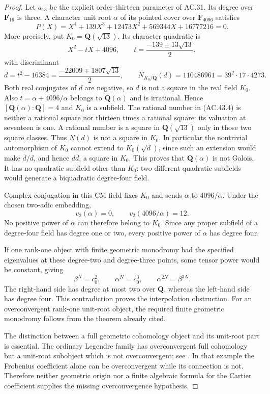 \begin{proof}
Let $a_{13}$ be the explicit order-thirteen parameter of AC.31.
Its degree over $\mathbf F_{16}$ is three. A character unit root
$\alpha$ of its pointed cover over $\mathbf F_{4096}$ satisfies
\[
 P(X)=X^4+139X^3+12473X^2+569344X+16777216=0.       \tag{AC.43.3}
\]
More precisely, put $K_0=\mathbf Q(\sqrt{13})$. Its character
quadratic is
\[
 X^2-tX+4096,
 \qquad t=\frac{-139\pm13\sqrt{13}}2,
\]
with discriminant
\[
 d=t^2-16384=\frac{-22009\mp1807\sqrt{13}}2,
 \qquad
 N_{K_0/\mathbf Q}(d)=110486961=39^2\cdot17\cdot4273.
                                                        \tag{AC.43.4}
\]
Both real conjugates of $d$ are negative, so $d$ is not a square
in the real field $K_0$. Also $t=\alpha+4096/\alpha$ belongs to
$\mathbf Q(\alpha)$ and is irrational. Hence
$[\mathbf Q(\alpha):\mathbf Q]=4$ and $K_0$ is a subfield.
The rational number in (AC.43.4) is neither a rational square nor
thirteen times a rational square: its valuation at seventeen is
one. A rational number is a square in $\mathbf Q(\sqrt{13})$
only in those two square classes. Thus $N(d)$ is not a square
in $K_0$. In particular the nontrivial automorphism of $K_0$
cannot extend to $K_0(\sqrt d)$, since such an extension would
make $\overline d/d$, and hence $d\overline d$, a square in $K_0$.
This proves that $\mathbf Q(\alpha)$ is not Galois. It has no
quadratic subfield other than $K_0$: two different quadratic
subfields would generate a biquadratic degree-four field.

Complex conjugation in this CM field fixes $K_0$ and sends
$\alpha$ to $4096/\alpha$. Under the chosen two-adic embedding,
\[
             v_2(\alpha)=0,
 \qquad v_2(4096/\alpha)=12.
\]
No positive power of $\alpha$ can therefore belong to $K_0$.
Since any proper subfield of a degree-four field has degree one
or two, every positive power of $\alpha$ has degree four.

If one rank-one object with finite geometric monodromy had the
specified eigenvalues at these degree-two and degree-three points,
some tensor power would be constant, giving
\[
                     \beta^N=c_0^2,
 \qquad \alpha^N=c_0^3,
 \qquad \alpha^{2N}=\beta^{3N}.
\]
The right-hand side has degree at most two over $\mathbf Q$,
whereas the left-hand side has degree four. This contradiction
proves the interpolation obstruction. For an overconvergent
rank-one unit-root object, the required finite geometric
monodromy follows from the theorem already cited.

The distinction between a full geometric cohomology object and
its unit-root part is essential. The ordinary Legendre family
has overconvergent full cohomology but a unit-root subobject
which is not overconvergent; see
\cite[Theorem~5.4.3.5, Corollary~5.4.3.10 and
Remark~5.4.3.11, pp.~49--52]{AC_Etesse2010}.
In that example the Frobenius coefficient alone can be
overconvergent while its connection is not. Therefore neither
geometric origin nor a finite algebraic formula for the Cartier
coefficient supplies the missing overconvergence hypothesis.
\end{proof}

